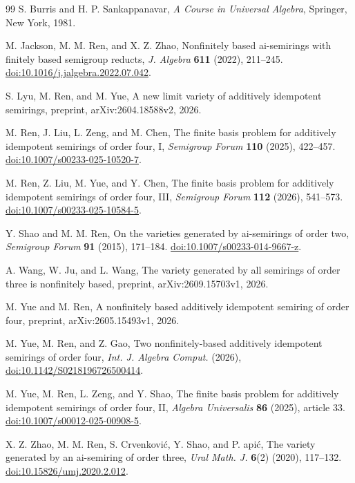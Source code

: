 \documentclass[11pt,reqno]{amsart}
\theoremstyle{remark}
\numberwithin{equation}{section}
\begin{document}
\begin{thebibliography}{99}
S. Burris and H. P. Sankappanavar,
\emph{A Course in Universal Algebra}, Springer, New York, 1981.

M. Jackson, M. M. Ren, and X. Z. Zhao,
Nonfinitely based ai-semirings with finitely based semigroup reducts,
\emph{J. Algebra} \textbf{611} (2022), 211--245.
\href{https://doi.org/10.1016/j.jalgebra.2022.07.042}{doi:10.1016/j.jalgebra.2022.07.042}.

S. Lyu, M. Ren, and M. Yue,
A new limit variety of additively idempotent semirings,
preprint, arXiv:2604.18588v2, 2026.

M. Ren, J. Liu, L. Zeng, and M. Chen,
The finite basis problem for additively idempotent semirings of order four, I,
\emph{Semigroup Forum} \textbf{110} (2025), 422--457.
\href{https://doi.org/10.1007/s00233-025-10520-7}{doi:10.1007/s00233-025-10520-7}.

M. Ren, Z. Liu, M. Yue, and Y. Chen,
The finite basis problem for additively idempotent semirings of order four, III,
\emph{Semigroup Forum} \textbf{112} (2026), 541--573.
\href{https://doi.org/10.1007/s00233-025-10584-5}{doi:10.1007/s00233-025-10584-5}.

Y. Shao and M. M. Ren,
On the varieties generated by ai-semirings of order two,
\emph{Semigroup Forum} \textbf{91} (2015), 171--184.
\href{https://doi.org/10.1007/s00233-014-9667-z}{doi:10.1007/s00233-014-9667-z}.

A. Wang, W. Ju, and L. Wang,
The variety generated by all semirings of order three is nonfinitely based,
preprint, arXiv:2609.15703v1, 2026.

M. Yue and M. Ren,
A nonfinitely based additively idempotent semiring of order four,
preprint, arXiv:2605.15493v1, 2026.

M. Yue, M. Ren, and Z. Gao,
Two nonfinitely-based additively idempotent semirings of order four,
\emph{Int. J. Algebra Comput.} (2026),
\href{https://doi.org/10.1142/S0218196726500414}{doi:10.1142/S0218196726500414}.

M. Yue, M. Ren, L. Zeng, and Y. Shao,
The finite basis problem for additively idempotent semirings of order four, II,
\emph{Algebra Universalis} \textbf{86} (2025), article 33.
\href{https://doi.org/10.1007/s00012-025-00908-5}{doi:10.1007/s00012-025-00908-5}.

X. Z. Zhao, M. M. Ren, S. Crvenkovi\'{c}, Y. Shao, and P. \DJ api\'{c},
The variety generated by an ai-semiring of order three,
\emph{Ural Math. J.} \textbf{6}(2) (2020), 117--132.
\href{https://doi.org/10.15826/umj.2020.2.012}{doi:10.15826/umj.2020.2.012}.
\end{thebibliography}
\end{document}
